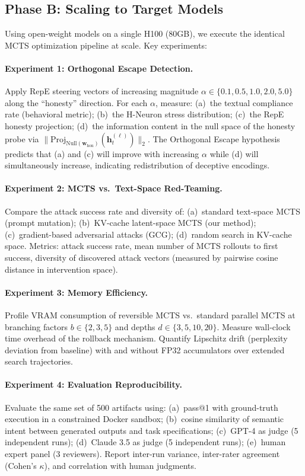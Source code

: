 \documentclass{article}
\begin{document}
\subsection{Phase B: Scaling to Target Models}

Using open-weight models on a single H100 (80GB), we execute the identical MCTS optimization pipeline at scale. Key experiments:

\paragraph{Experiment 1: Orthogonal Escape Detection.}
Apply RepE steering vectors of increasing magnitude $\alpha \in \{0.1, 0.5, 1.0, 2.0, 5.0\}$ along the ``honesty'' direction. For each $\alpha$, measure: (a)~the textual compliance rate (behavioral metric); (b)~the H-Neuron stress distribution; (c)~the RepE honesty projection; (d)~the information content in the null space of the honesty probe via $\|\text{Proj}_{\text{Null}(\mathbf{w}_{\text{hon}})}(\mathbf{h}_t^{(\ell)})\|_2$. The Orthogonal Escape hypothesis predicts that (a) and (c) will improve with increasing $\alpha$ while (d) will simultaneously increase, indicating redistribution of deceptive encodings.

\paragraph{Experiment 2: MCTS vs.\ Text-Space Red-Teaming.}
Compare the attack success rate and diversity of: (a)~standard text-space MCTS (prompt mutation); (b)~KV-cache latent-space MCTS (our method); (c)~gradient-based adversarial attacks (GCG); (d)~random search in KV-cache space. Metrics: attack success rate, mean number of MCTS rollouts to first success, diversity of discovered attack vectors (measured by pairwise cosine distance in intervention space).

\paragraph{Experiment 3: Memory Efficiency.}
Profile VRAM consumption of reversible MCTS vs.\ standard parallel MCTS at branching factors $b \in \{2, 3, 5\}$ and depths $d \in \{3, 5, 10, 20\}$. Measure wall-clock time overhead of the rollback mechanism. Quantify Lipschitz drift (perplexity deviation from baseline) with and without FP32 accumulators over extended search trajectories.

\paragraph{Experiment 4: Evaluation Reproducibility.}
Evaluate the same set of 500 artifacts using: (a)~pass@1 with ground-truth execution in a constrained Docker sandbox; (b)~cosine similarity of semantic intent between generated outputs and task specifications; (c)~GPT-4 as judge (5 independent runs); (d)~Claude 3.5 as judge (5 independent runs); (e)~human expert panel (3 reviewers). Report inter-run variance, inter-rater agreement (Cohen's $\kappa$), and correlation with human judgments.
\end{document}

